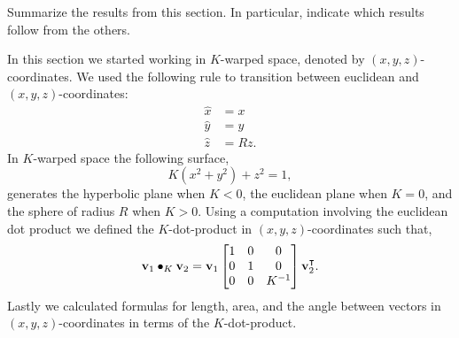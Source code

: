 \documentclass[newpage,hints,handout,12pt,noauthor,nooutcomes]{ximera}
\begin{document}


\begin{problem}
Summarize the results from this section. In particular, indicate which
results follow from the others.
\begin{freeResponse}
In this section we started working in $K$-warped space, denoted by $(x, y, z)$-coordinates. We used the following rule to transition between euclidean and  $(x, y, z)$-coordinates:
\begin{align*}
\hat{x}  &  =x\\
\hat{y}  &  =y\\
\hat{z}  &  =Rz.
\end{align*}
In $K$-warped space the following surface,
\[
K\left(x^{2}+y^{2}\right)+z^{2}=1,
\]
 generates the hyperbolic plane when $K<0$, the euclidean plane when $K=0$, and the sphere of radius $R$ when $K> 0$. Using a computation involving the euclidean dot product we defined the $K$-dot-product in $(x, y, z)$-coordinates such that,
\[
\mathbf{v}_{1}\bullet_{K}\mathbf{v}_{2}  = \mathbf{v}_{1} 
\begin{bmatrix}
1 & 0 & 0\\
0 & 1 & 0\\
0 & 0 & K^{-1}%
\end{bmatrix}
\mathbf{v}_{2}^\transpose.
\]
Lastly we calculated formulas for length, area, and the angle between vectors in $(x,y,z)$-coordinates in terms of the $K$-dot-product.
\end{freeResponse}
\end{problem}
\end{document}
